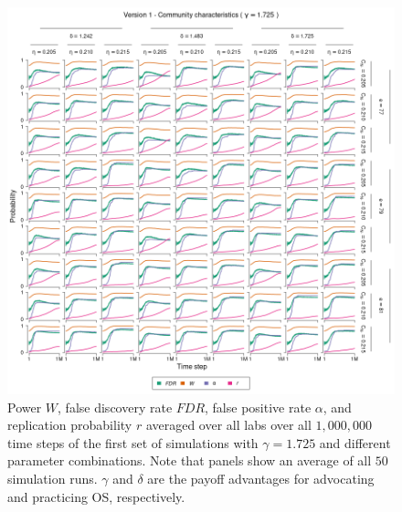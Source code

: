 \documentclass[meta, authordate,issue]{jote-new-article}
\begin{document}
\begin{figure}
  \begin{fullwidth}
    \centering
    \includegraphics[width=\textwidth]{v1_cha_plot_sens_payypro1.725.png}
    \caption{Power $W$, false discovery rate $FDR$, false positive rate $\alpha$, and replication probability $r$ averaged over all labs over all $1,000,000$ time steps of the first set of simulations with $\gamma=1.725$ and different parameter combinations. Note that panels show an average of all $50$ simulation runs. $\gamma$ and $\delta$ are the payoff advantages for advocating and practicing OS, respectively.}
    \label{fig:v1_cha_plot_sens_payypro1.725}
  \end{fullwidth}
\end{figure}
%
%
\end{document}
